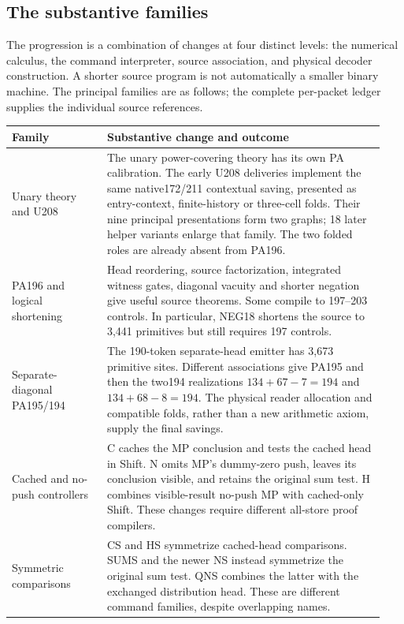 \subsection{The substantive families}

The progression is a combination of changes at four distinct levels: the
numerical calculus, the command interpreter, source association, and physical
decoder construction. A shorter source program is not automatically a smaller
binary machine. The principal families are as follows; the complete per-packet
ledger supplies the individual source references.

\begin{longtable}{@{}p{0.24\linewidth}p{0.70\linewidth}@{}}
\toprule
Family & Substantive change and outcome\\
\midrule\endhead
Unary theory and U208 &
The unary power-covering theory has its own PA calibration. The early U208
deliveries implement the same native172/211 contextual saving, presented as
entry-context, finite-history or three-cell folds. Their nine principal
presentations form two graphs; 18 later helper variants enlarge that family.
The two folded roles are already absent from PA196.\\[3pt]
PA196 and logical shortening &
Head reordering, source factorization, integrated witness gates, diagonal
vacuity and shorter negation give useful source theorems. Some compile to
197--203 controls. In particular, NEG18 shortens the source to 3,441 primitives
but still requires 197 controls.\\[3pt]
Separate-diagonal PA195/194 &
The 190-token separate-head emitter has 3,673 primitive sites. Different
associations give PA195 and then the two194 realizations
$134+67-7=194$ and $134+68-8=194$. The physical reader allocation and compatible
folds, rather than a new arithmetic axiom, supply the final savings.\\[3pt]
Cached and no-push controllers &
C caches the MP conclusion and tests the cached head in Shift. N omits MP's
dummy-zero push, leaves its conclusion visible, and retains the original sum
test. H combines visible-result no-push MP with cached-only Shift. These
changes require different all-store proof compilers.\\[3pt]
Symmetric comparisons &
CS and HS symmetrize cached-head comparisons. SUMS and the newer NS instead
symmetrize the original sum test. QNS combines the latter with the exchanged
distribution head. These are different command families, despite overlapping
names.\\[3pt]

\end{longtable}
